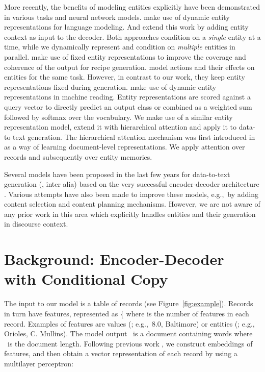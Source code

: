 \documentclass[11pt,a4paper]{article}
\newcommand{\lform}[1]{\textsf{\scriptsize{#1}}}
\begin{document}
More recently, the benefits of modeling entities explicitly have been
demonstrated in various tasks and neural network models.
 make use of dynamic entity representations for
language modeling. And  extend this work by adding
entity context as input to the decoder. Both approaches condition on a
\emph{single} entity at a time, while we dynamically represent and
condition on \emph{multiple} entities in parallel.  
make use of fixed entity representations to improve the coverage and
coherence of the output for recipe generation.
 model actions and their effects on
entities for the same task.  However, in contrast to our work, they
keep entity representations fixed during
generation.  make use of dynamic entity
representations in machine reading. Entity representations are scored
against a query vector to directly predict an output class or combined
as a weighted sum followed by softmax over the vocabulary. We make use
of a similar entity representation model, extend it with hierarchical
attention and apply it to data-to text generation.  The hierarchical
attention mechanism was first introduced in  as a
way of learning document-level representations. We apply attention
over records and subsequently over entity memories.



Several models have been proposed in the last few years for
data-to-text generation (\citealt{N16-1086,D16-1128,D17-1239}, inter
alia) based on the very successful encoder-decoder architecture
\cite{DBLP:journals/corr/BahdanauCB14}. Various attempts have also
been made to improve these models, e.g.,~by adding content selection
\cite{N18-1137} and content planning
\cite{DBLP:journals/corr/abs-1809-00582} mechanisms. However, we are
not aware of any prior work in this area which explicitly handles
entities and their generation in discourse context.







\section{Background: Encoder-Decoder with Conditional Copy}
\label{sec:ed-cc}

The input to our model is a table of records (see
Figure~\ref{fig:example}). Records in turn have features, 
represented as \{ where 
is the number of features in each record.
Examples of features are values (; e.g.,~\lform{\small 8.0},
\lform{\small Baltimore}) or entities (; e.g.,~\lform{\small
  Orioles}, \lform{\small C. Mullins}).  The model output~ is
a document containing words  where ~is
the document length.
Following previous work
\cite{D17-1239,DBLP:journals/corr/abs-1809-00582}, we
construct embeddings of features, and then obtain a vector
representation  of each record by using a multilayer
perceptron:
\end{document}
